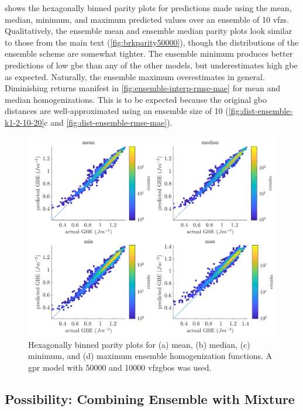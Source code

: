\documentclass[preprint,12pt]{elsarticle}
\begin{document}
 shows the hexagonally binned parity plots for predictions made using the mean, median, minimum, and maximum predicted values over an ensemble of 10 \glspl{vfz}. Qualitatively, the ensemble mean and ensemble median parity plots look similar to those from the main text (\cref{fig:brkparity50000}), though the distributions of the ensemble scheme are somewhat tighter. The ensemble minimum produces better predictions of low \gls{gbe} than any of the other models, but underestimates high \gls{gbe} as expected. Naturally, the ensemble maximum overestimates in general. Diminishing returns manifest in \cref{fig:ensemble-interp-rmse-mae} for mean and median homogenizations. This is to be expected because the original \gls{gbo} distances \cite{francisGeodesicOctonionMetric2019} are well-approximated using an ensemble size of 10 (\cref{fig:dist-ensemble-k1-2-10-20}c and \cref{fig:dist-ensemble-rmse-mae}).
\begin{figure}[h!]
    \centering
    \includegraphics[scale=1]{figures/ensemble-interp.png}
    \caption{Hexagonally binned parity plots for (a) mean, (b) median, (c) minimum, and (d) maximum ensemble homogenization functions. A \gls{gpr} model with \num{50000} \inpt{} and \num{10000} \outpt{} \glspl{vfzgbo} was used. }
    \label{fig:ensemble-interp}
\end{figure}

\subsection{Possibility: Combining Ensemble with  Mixture}
\label{sec:ensemble-interp:egprm}
\end{document}
